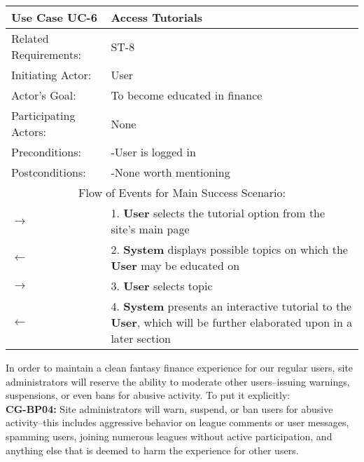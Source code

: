 \begin{centering}
\renewcommand\arraystretch{1.3} %
\label{UC-6}
\begin{longtable}{|p{1.2in} p{5in}|}
\hline

\bfseries{\color{color1}Use Case UC-6} & \bfseries{\color{color1}Access Tutorials} \\
\hline
Related Requirements: & ST-8 \\ 
Initiating Actor:     & User \\
Actor's Goal:         & To become educated in finance \\
Participating Actors:  & None \\
Preconditions:        & -User is logged in \\
Postconditions:       & -None worth mentioning \\
\hline
\multicolumn{2}{|c|}{\color{color1}Flow of Events for Main Success Scenario:}\\
\hline
$\rightarrow$ & 1. \textbf{User} selects the tutorial option from the site's main page \\
$\leftarrow$ & 2. \textbf{System} displays possible topics on which the \textbf{User} may be educated on \\
$\rightarrow$ & 3. \textbf{User} selects topic \\
$\leftarrow$ & 4. \textbf{System} presents an interactive tutorial to the \textbf{User}, which will be further elaborated upon in a later section \\
\hline
\end{longtable}
\end{centering}

In order to maintain a clean fantasy finance experience for our regular users, site administrators will reserve the ability to moderate other users--issuing warnings, suspensions, or even bans for abusive activity. To put it explicitly: \\
\textbf{CG-BP04:} Site administrators will warn, suspend, or ban users for abusive activity--this includes aggressive behavior on league comments or user messages, spamming users, joining numerous leagues without active participation, and anything else that is deemed to harm the experience for other users. \\



